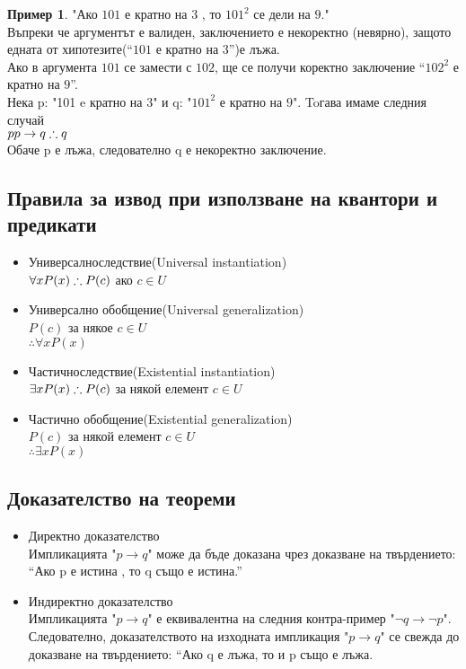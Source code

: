 \documentclass[fleqn, 12pt]{article}
\theoremstyle{definition}
\newtheorem{example}{Пример}[subsection]
\begin{document}
\begin{example}
"Ако $101$ е кратно на $3$ , то $101^2$ се дели на $9$." \\
Въпреки че аргументът е валиден, заключението е некоректно (невярно), защото едната от хипотезите(“$101$ е кратно на $3$”)е лъжа. \\
Ако в аргумента $101$ се замести с $102$, ще се получи коректно заключение “$102^2$ е кратно на $9$”.
\\ 
Нека p: "101 e кратно на 3" и q: "$101^2$ е кратно на $9$". Toгава имаме следния случай
\\
$p
\\ p \to q 
\\ \therefore q$
\\Обаче p е лъжа, следователно q е некоректно заключение. 
\end{example}

\subsection{Правила за извод при използване на квантори и предикати}

\begin{itemize}
	\item Универсалноследствие(Universal instantiation)
\\
$\forall x P(x) 
\\
\therefore P(c)$ ако $c \in U$
	\item Универсално обобщение(Universal generalization)
\\
$ P(c)$ за някое $c \in U$ 
\\
$\therefore\forall x P(x)$

	\item Частичноследствие(Existential instantiation)
\\
$\exists x P(x) 
\\
\therefore P(c)$ за някой елемент $c \in U$

	\item Частично обобщение(Existential generalization)
\\
$P(c)$ за някой елемент $c \in U$
\\
$\therefore \exists x P(x)  $
\end{itemize}

\subsection{Доказателство на теореми}
\begin{itemize}
	\item Директно доказателство \\
Импликацията "$p \to q$" може да бъде доказана чрез доказване на твърдението:\\
 “Ако p е истина , то q също е истина.”
	\item Индиректно доказателство \\
Импликацията "$p \to q$" е еквивалентна на следния контра-пример "$\neg q \to \neg p$". Следователно, доказателството на изходната импликация "$p \to q$" се свежда до доказване на твърдението: “Ако q е лъжа, то и p също е лъжа.
\end{itemize}
\end{document}
